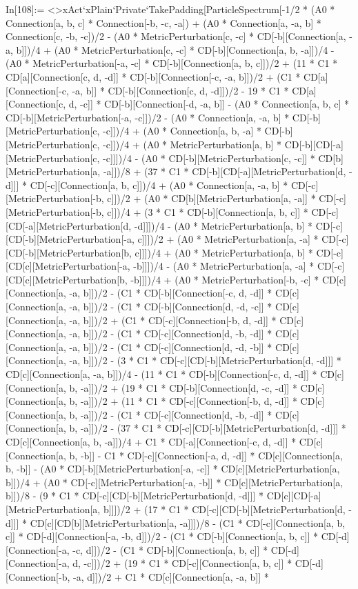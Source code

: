 In[108]:= <>xAct`xPlain`Private`TakePadding[ParticleSpectrum[-1/2 * (A0 * Connection[a, b, c] * Connection[-b, -c, -a]) + (A0 * Connection[a, -a, b] * Connection[c, -b, -c])/2 - (A0 * MetricPerturbation[c, -c] * CD[-b][Connection[a, -a, b]])/4 + (A0 * MetricPerturbation[c, -c] * CD[-b][Connection[a, b, -a]])/4 - (A0 * MetricPerturbation[-a, -c] * CD[-b][Connection[a, b, c]])/2 + (11 * C1 * CD[a][Connection[c, d, -d]] * CD[-b][Connection[-c, -a, b]])/2 + (C1 * CD[a][Connection[-c, -a, b]] * CD[-b][Connection[c, d, -d]])/2 - 19 * C1 * CD[a][Connection[c, d, -c]] * CD[-b][Connection[-d, -a, b]] - (A0 * Connection[a, b, c] * CD[-b][MetricPerturbation[-a, -c]])/2 - (A0 * Connection[a, -a, b] * CD[-b][MetricPerturbation[c, -c]])/4 + (A0 * Connection[a, b, -a] * CD[-b][MetricPerturbation[c, -c]])/4 + (A0 * MetricPerturbation[a, b] * CD[-b][CD[-a][MetricPerturbation[c, -c]]])/4 - (A0 * CD[-b][MetricPerturbation[c, -c]] * CD[b][MetricPerturbation[a, -a]])/8 + (37 * C1 * CD[-b][CD[-a][MetricPerturbation[d, -d]]] * CD[-c][Connection[a, b, c]])/4 + (A0 * Connection[a, -a, b] * CD[-c][MetricPerturbation[-b, c]])/2 + (A0 * CD[b][MetricPerturbation[a, -a]] * CD[-c][MetricPerturbation[-b, c]])/4 + (3 * C1 * CD[-b][Connection[a, b, c]] * CD[-c][CD[-a][MetricPerturbation[d, -d]]])/4 - (A0 * MetricPerturbation[a, b] * CD[-c][CD[-b][MetricPerturbation[-a, c]]])/2 + (A0 * MetricPerturbation[a, -a] * CD[-c][CD[-b][MetricPerturbation[b, c]]])/4 + (A0 * MetricPerturbation[a, b] * CD[-c][CD[c][MetricPerturbation[-a, -b]]])/4 - (A0 * MetricPerturbation[a, -a] * CD[-c][CD[c][MetricPerturbation[b, -b]]])/4 + (A0 * MetricPerturbation[-b, -c] * CD[c][Connection[a, -a, b]])/2 - (C1 * CD[-b][Connection[-c, d, -d]] * CD[c][Connection[a, -a, b]])/2 - (C1 * CD[-b][Connection[d, -d, -c]] * CD[c][Connection[a, -a, b]])/2 + (C1 * CD[-c][Connection[-b, d, -d]] * CD[c][Connection[a, -a, b]])/2 - (C1 * CD[-c][Connection[d, -b, -d]] * CD[c][Connection[a, -a, b]])/2 - (C1 * CD[-c][Connection[d, -d, -b]] * CD[c][Connection[a, -a, b]])/2 - (3 * C1 * CD[-c][CD[-b][MetricPerturbation[d, -d]]] * CD[c][Connection[a, -a, b]])/4 - (11 * C1 * CD[-b][Connection[-c, d, -d]] * CD[c][Connection[a, b, -a]])/2 + (19 * C1 * CD[-b][Connection[d, -c, -d]] * CD[c][Connection[a, b, -a]])/2 + (11 * C1 * CD[-c][Connection[-b, d, -d]] * CD[c][Connection[a, b, -a]])/2 - (C1 * CD[-c][Connection[d, -b, -d]] * CD[c][Connection[a, b, -a]])/2 - (37 * C1 * CD[-c][CD[-b][MetricPerturbation[d, -d]]] * CD[c][Connection[a, b, -a]])/4 + C1 * CD[-a][Connection[-c, d, -d]] * CD[c][Connection[a, b, -b]] - C1 * CD[-c][Connection[-a, d, -d]] * CD[c][Connection[a, b, -b]] - (A0 * CD[-b][MetricPerturbation[-a, -c]] * CD[c][MetricPerturbation[a, b]])/4 + (A0 * CD[-c][MetricPerturbation[-a, -b]] * CD[c][MetricPerturbation[a, b]])/8 - (9 * C1 * CD[-c][CD[-b][MetricPerturbation[d, -d]]] * CD[c][CD[-a][MetricPerturbation[a, b]]])/2 + (17 * C1 * CD[-c][CD[-b][MetricPerturbation[d, -d]]] * CD[c][CD[b][MetricPerturbation[a, -a]]])/8 - (C1 * CD[-c][Connection[a, b, c]] * CD[-d][Connection[-a, -b, d]])/2 - (C1 * CD[-b][Connection[a, b, c]] * CD[-d][Connection[-a, -c, d]])/2 - (C1 * CD[-b][Connection[a, b, c]] * CD[-d][Connection[-a, d, -c]])/2 + (19 * C1 * CD[-c][Connection[a, b, c]] * CD[-d][Connection[-b, -a, d]])/2 + C1 * CD[c][Connection[a, -a, b]] * 